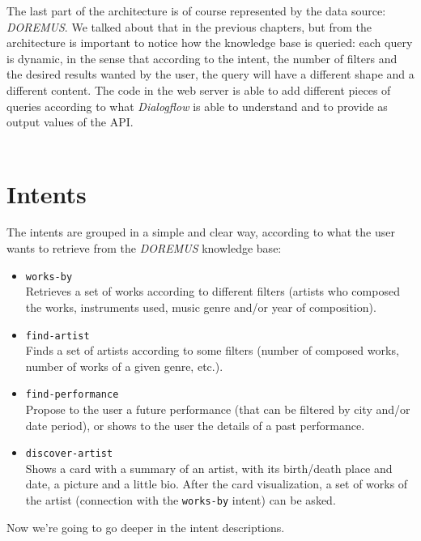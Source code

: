 \documentclass[a4paper,12pt]{report}
\begin{document}
	The last part of the architecture is of course represented by the data source: \textit{DOREMUS}. We talked about that in the previous chapters, but from the architecture is important to notice how the knowledge base is queried: each query is dynamic, in the sense that according to the intent, the number of filters and the desired results wanted by the user, the query will have a different shape and a different content. The code in the web server is able to add different pieces of queries according to what \textit{Dialogflow} is able to understand and to provide as output values of the API.\\\\
	\section{Intents}
	The intents are grouped in a simple and clear way, according to what the user wants to retrieve from the \textit{DOREMUS} knowledge base:
	\begin{itemize}
		\item \texttt{works-by}\\
		Retrieves a set of works according to different filters (artists who composed the works, instruments used, music genre and/or year of composition).
		\item \texttt{find-artist}\\
		Finds a set of artists according to some filters (number of composed works, number of works of a given genre, etc.).
		\item \texttt{find-performance}\\
		Propose to the user a future performance (that can be filtered by city and/or date period), or shows to the user the details of a past performance.
		\item \texttt{discover-artist}\\
		Shows a card with a summary of an artist, with its birth/death place and date, a picture and a little bio. After the card visualization, a set of works of the artist (connection with the \texttt{works-by} intent) can be asked.
	\end{itemize}
	Now we're going to go deeper in the intent descriptions.
\end{document}
